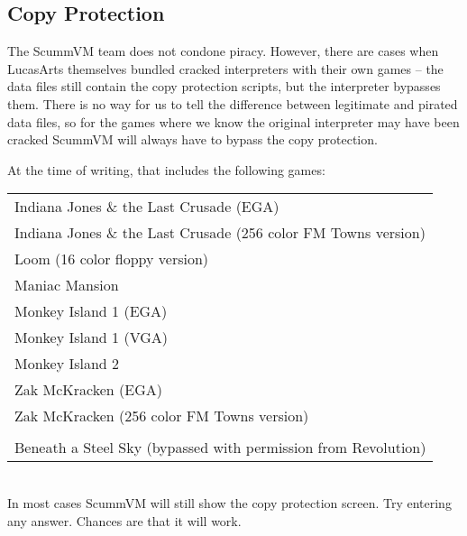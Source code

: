 \subsection{Copy Protection}

The ScummVM team does not condone piracy. However, there are cases when
LucasArts themselves bundled cracked interpreters with their own games --
the data files still contain the copy protection scripts, but the interpreter
bypasses them. There is no way for us to tell the difference between legitimate
and pirated data files, so for the games where we know the original interpreter
may have been cracked ScummVM will always have to bypass the copy protection.

At the time of writing, that includes the following games:

\begin{tabular}{l}
Indiana Jones \& the Last Crusade (EGA)\\
Indiana Jones \& the Last Crusade (256 color FM Towns version)\\
Loom (16 color floppy version)\\
Maniac Mansion\\
Monkey Island 1 (EGA)\\
Monkey Island 1 (VGA)\\
Monkey Island 2\\
Zak McKracken (EGA)\\
Zak McKracken (256 color FM Towns version)\\
\\
Beneath a Steel Sky (bypassed with permission from Revolution)
\end{tabular}\\

In most cases ScummVM will still show the copy protection screen. Try entering
any answer. Chances are that it will work.